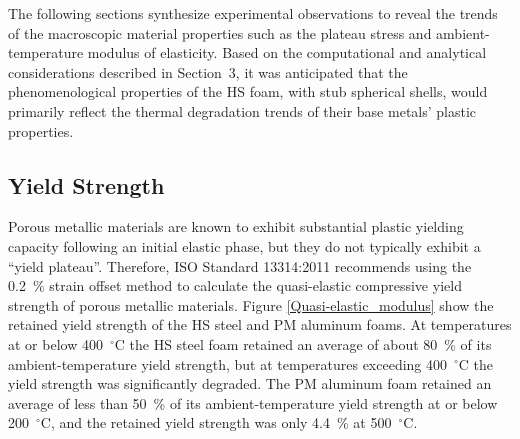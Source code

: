 \documentclass[review]{elsarticle}
\begin{document}
The following sections synthesize experimental observations to reveal the trends of the macroscopic material properties such as the plateau stress and ambient-temperature modulus of elasticity. Based on the computational and analytical considerations described in Section~3, it was anticipated that the phenomenological properties of the HS foam, with stub spherical shells, would primarily reflect the thermal degradation trends of their base metals' plastic properties.

\subsection{Yield Strength}

Porous metallic materials are known to exhibit substantial plastic yielding capacity following an initial elastic phase, but they do not typically exhibit a ``yield plateau''. Therefore, ISO Standard 13314:2011 recommends using the 0.2~\% strain offset method to calculate the quasi-elastic compressive yield strength of porous metallic materials. Figure \ref{Quasi-elastic_modulus} show the retained yield strength of the HS steel and PM aluminum foams. At temperatures at or below 400~$^\circ\mathrm{C}$ the HS steel foam retained an average of about 80~\% of its ambient-temperature yield strength, but at temperatures exceeding 400~$^\circ\mathrm{C}$ the yield strength was significantly degraded. The PM aluminum foam retained an average of less than 50~\% of its ambient-temperature yield strength at or below 200~$^\circ\mathrm{C}$, and the retained yield strength was only 4.4~\% at 500~$^\circ\mathrm{C}$.
\end{document}
